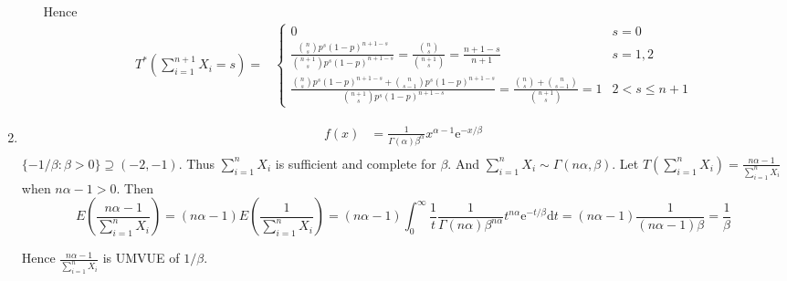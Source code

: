 \documentclass{article}
\begin{document}
\begin{enumerate}[leftmargin = 0 em, label = \arabic*., font = \bfseries]
\begin{enumerate}
		            Hence
		            \begin{align*}
			            T^* (\sum_{i=1}^{n+1} X_i = s) = & \begin{cases}
				            0                                                                                                                                                                        & s = 0          \\
				            \frac{\binom{n}{s} p^s (1-p)^{n+1 - s}}{\binom{n+1}{s} p^s (1-p)^{n+1 - s}} = \frac{\binom{n}{s}}{\binom{n+1}{s}} = \frac{n+1-s}{n+1}                                    & s = 1,2        \\
				            \frac{\binom{n}{s} p^s (1-p)^{n+1-s} + \binom{n}{s-1} p^{s} (1-p)^{n+1-s}}{\binom{n+1}{s} p^s (1-p)^{n+1 - s}} = \frac{\binom{n}{s}+ \binom{n}{s-1}}{\binom{n+1}{s}} = 1 & 2 < s \leq n+1
			            \end{cases}
		            \end{align*}

	      \end{enumerate}

	\item
	      \begin{align*}
		      f(x) & = \frac{1}{\Gamma(\alpha) \beta^\alpha} x^{\alpha - 1} \mathrm{e}^{-x/\beta} \\
	      \end{align*}
	      $\{-1/\beta : \beta > 0\} \supseteq (-2,-1)$. Thus $\sum_{i=1}^n X_i$ is sufficient and complete for $\beta$. And $\sum_{i=1}^n X_i \sim \Gamma (n \alpha , \beta)$.
	      Let $T(\sum_{i=1}^n X_i) = \frac{n \alpha - 1} {\sum_{i=1}^n X_i}$ when $n \alpha - 1 > 0$.
	      Then
	      \[E(\frac{n \alpha - 1}{\sum_{i=1}^n X_i}) = (n \alpha - 1) E(\frac{1}{\sum_{i = 1}^n X_i}) = (n \alpha - 1)\int_{0}^\infty \frac{1}{t} \frac{1}{\Gamma(n \alpha) \beta^{n \alpha}} t^{n \alpha} \mathrm{e}^{- t /\beta} \mathrm{d}t = (n \alpha - 1) \frac{1}{(n \alpha - 1) \beta } = \frac{1}{\beta}\]

	      Hence $\frac{n \alpha - 1}{\sum_{i=1}^n X_i}$ is UMVUE of $1/\beta$.

\end{enumerate}
\end{document}
